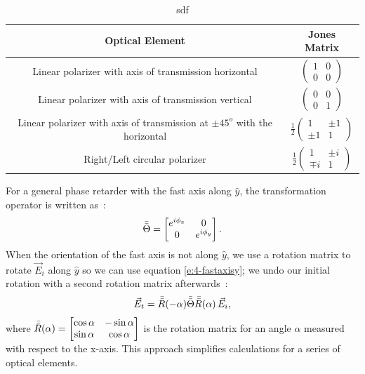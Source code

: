 \begin{table}
\caption{sdf}
\begin{tabular}{|c|c|}
\hline
{\bf Optical Element} & {\bf Jones Matrix} \\ \hline \hline
Linear polarizer with axis of transmission horizontal & $\begin{pmatrix}1 & 0 \\ 0 & 0 \end{pmatrix}$ \\ \hline
Linear polarizer with axis of transmission vertical &$\begin{pmatrix}0 & 0 \\ 0 & 1 \end{pmatrix}$ \\ \hline
Linear polarizer with axis of transmission at $\pm 45^o$ with the horizontal &$\frac{1}{2} \begin{pmatrix}1 & \pm 1 \\ \pm 1 & 1\end{pmatrix}$ \\ \hline
Right/Left circular polarizer & $\frac{1}{2} \begin{pmatrix}
1 & \pm i \\ \mp i & 1
\end{pmatrix}$ \\
\hline
\end{tabular}\label{t:4-jmats}
\end{table}

For a general phase retarder with the fast axis along $\hat{y}$, the transformation operator is written as~\cite{RN232}:
\begin{equation}\label{e:4-fastaxisy}
\bar{\bar{\Theta}} = \begin{bmatrix}e^{i \phi_x} & 0 \\ 0 & e^{i \phi_y} \end{bmatrix}.
\end{equation}
When the orientation of the fast axis is not along $\hat{y}$, we use a rotation matrix to rotate $\vec{E}_i$ along $\hat{y}$ so we can use equation \ref{e:4-fastaxisy}; we undo our initial rotation with a second rotation matrix afterwards~:
\begin{equation} \label{e:4-jones_decouple}
\vec{E}_t = \bar{\bar{R}}(-\alpha)\bar{\bar{\Theta}} \bar{\bar{R}}(\alpha)\,\vec{E}_i,
\end{equation}
where $\bar{\bar{R}}(\alpha) = \begin{bmatrix} \cos \alpha & -\sin \alpha \\ \sin \alpha & \cos \alpha \end{bmatrix}$
is the rotation matrix for an angle $\alpha$ measured with respect to the x-axis.
This approach simplifies calculations for a series of optical elements.


